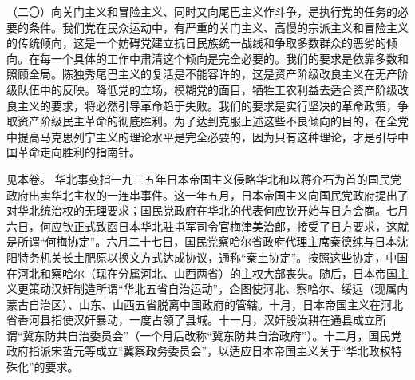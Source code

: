 （二〇）向关门主义和冒险主义、同时又向尾巴主义作斗争，是执行党的任务的必要的条件。我们党在民众运动中，有严重的关门主义、高慢的宗派主义和冒险主义的传统倾向，这是一个妨碍党建立抗日民族统一战线和争取多数群众的恶劣的倾向。在每一个具体的工作中肃清这个倾向是完全必要的。我们的要求是依靠多数和照顾全局。陈独秀尾巴主义的复活是不能容许的，这是资产阶级改良主义在无产阶级队伍中的反映。降低党的立场，模糊党的面目，牺牲工农利益去适合资产阶级改良主义的要求，将必然引导革命趋于失败。我们的要求是实行坚决的革命政策，争取资产阶级民主革命的彻底胜利。为了达到克服上述这些不良倾向的目的，在全党中提高马克思列宁主义的理论水平是完全必要的，因为只有这种理论，才是引导中国革命走向胜利的指南针。


\begin{maonote}
见本卷。
华北事变指一九三五年日本帝国主义侵略华北和以蒋介石为首的国民党政府出卖华北主权的一连串事件。这一年五月，日本帝国主义向国民党政府提出了对华北统治权的无理要求；国民党政府在华北的代表何应钦开始与日方会商。七月六日，何应钦正式致函日本华北驻屯军司令官梅津美治郎，接受了日方要求，这就是所谓“何梅协定”。六月二十七日，国民党察哈尔省政府代理主席秦德纯与日本沈阳特务机关长土肥原以换文方式达成协议，通称“秦土协定”。按照这些协定，中国在河北和察哈尔（现在分属河北、山西两省）的主权大部丧失。随后，日本帝国主义更策动汉奸制造所谓“华北五省自治运动”，企图使河北、察哈尔、绥远（现属内蒙古自治区）、山东、山西五省脱离中国政府的管辖。十月，日本帝国主义在河北省香河县指使汉奸暴动，一度占领了县城。十一月，汉奸殷汝耕在通县成立所谓“冀东防共自治委员会”（一个月后改称“冀东防共自治政府”）。十二月，国民党政府指派宋哲元等成立“冀察政务委员会”，以适应日本帝国主义关于“华北政权特殊化”的要求。

\end{maonote}
